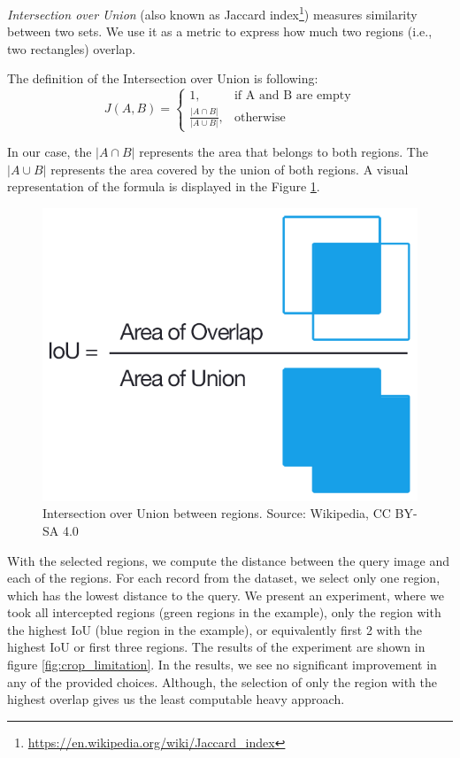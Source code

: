 \emph{Intersection over Union} (also known as Jaccard index\footnote{\href{https://en.wikipedia.org/wiki/Jaccard_index}{https://en.wikipedia.org/wiki/Jaccard\_index}}) measures similarity between two sets. We use it as a metric to express how much two regions (i.e., two rectangles) overlap. 

The definition of the Intersection over Union is following:
$$
    J(A, B) = 
    \begin{cases}
      1, & \text{if\ A and B are empty} \\
      \frac{|A \cap B|}{|A \cup B|}, & \text{otherwise}
    \end{cases}
$$

In our case, the $|A \cap B|$ represents the area that belongs to both regions. The  $|A \cup B|$ represents the area covered by the union of both regions. A visual representation of the formula is displayed in the Figure \ref{fig:intersection_over_union}.

\begin{figure}
    \centering
	\includegraphics[width=0.3\linewidth]{img/Intersection_over_Union_-_visual_equation.png}
	\caption{Intersection over Union between regions. Source: Wikipedia, CC BY-SA 4.0}
	\label{fig:intersection_over_union}
\end{figure}

With the selected regions, we compute the distance between the query image and each of the regions. For each record from the dataset, we select only one region, which has the lowest distance to the query.
We present an experiment, where we took all intercepted regions (green regions in the example), only the region with the highest IoU (blue region in the example), or equivalently first 2 with the highest IoU or first three regions. The results of the experiment are shown in figure \ref{fig:crop_limitation}. In the results, we see no significant improvement in any of the provided choices. Although, the selection of only the region with the highest overlap gives us the least computable heavy approach.

